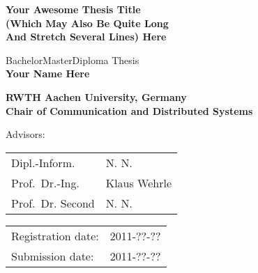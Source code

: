 \titlehead{
	\centering
	\texttt{[image: logos/comsys-text]}
	\hfill
	\texttt{[image: logos/rwth]}
} %

\begin{titlepage}

\let\footnotesize\small \let\footnoterule\relax

\hbox{}
\vfill

\centering

\begin{doublespace} 
{ \huge\textbf{\textsf{Your Awesome Thesis Title \\ \vspace{-0.4em}
(Which May Also Be Quite Long \\ \vspace{0.4em}
And Stretch Several Lines) Here}}}
\end{doublespace}
\vskip 2cm

{\large BachelorMasterDiploma Thesis\\[5pt]}
{\large \textbf{Your Name Here}}
\vskip 1cm

\textbf{RWTH Aachen University, Germany\\[5pt]
        Chair of Communication and Distributed Systems}
\vskip 2cm

\large

Advisors:
\vskip 2mm

\begin{tabular}{R{7cm}p{7cm}}
Dipl.-Inform. & N. N.\\
Prof.~Dr.-Ing. & Klaus Wehrle\\
Prof.~Dr. Second & N. N.
\end{tabular}
\vskip 1cm

\begin{tabular}{R{6cm}p{6cm}}
Registration date:  & 2011-??-?? \\
Submission date:    & 2011-??-?? \\
\end{tabular}

\vfill

\end{titlepage}

